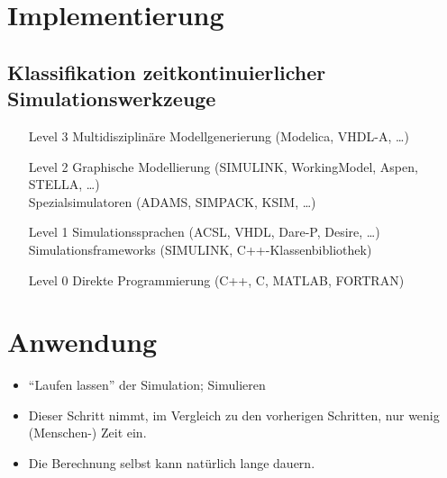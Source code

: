 \documentclass[a4paper, 11pt, accentcolor = tud3b]{tudreport}
\begin{document}

        \section{Implementierung} %
	        \label{sec:sim_impl}
        
            \subsection{Klassifikation zeitkontinuierlicher Simulationswerkzeuge} %
	            \begin{itemize}
	            	\item[Level 3] Multidisziplinäre Modellgenerierung (Modelica, VHDL-A, \dots)
	            	\item[Level 2] Graphische Modellierung (SIMULINK, WorkingModel, Aspen, STELLA, \dots) \\
					               Spezialsimulatoren (ADAMS, SIMPACK, KSIM, \dots)
		            \item[Level 1] Simulationssprachen (ACSL, VHDL, Dare-P, Desire, \dots) \\
						           Simulationsframeworks (SIMULINK, C++-Klassenbibliothek)
			        \item[Level 0] Direkte Programmierung (C++, C, MATLAB, FORTRAN)
	            \end{itemize}

        \section{Anwendung} %
	        \label{sec:sim_anwendung}
        
	        \begin{itemize}
	        	\item \enquote{Laufen lassen} der Simulation; Simulieren
	        	\item Dieser Schritt nimmt, im Vergleich zu den vorherigen Schritten, nur wenig (Menschen-) Zeit ein.
	        	\item Die Berechnung selbst kann natürlich lange dauern.
	        \end{itemize}
\end{document}
